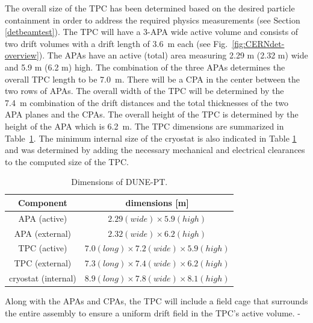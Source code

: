 The overall size of the TPC has been determined based on the desired particle containment in order to address the required physics measurements (see Section \ref{detbeamtest}). The TPC will have a 3-APA wide active volume and consists of two drift volumes with a drift length of 3.6~m each (see Fig.~\ref{fig:CERNdet-overview}).  
The APAs have an active (total) area measuring 2.29 m (2.32 m) wide and 5.9 m (6.2 m) high. The combination of the three APAs determines the overall TPC length to be 7.0~m. There will be a CPA in the center between the two rows of APAs.  
The overall width of the TPC will be determined by the 7.4~m combination of the drift distances and the total thicknesses of the two APA planes and the CPAs.  
The overall height of the TPC is determined by the height of the APA which is 6.2~m.  The TPC dimensions are summarized in 
Table~\ref{table:TPC-dim}.
%
The minimum internal size of the cryostat is also indicated in Table \ref{table:TPC-dim} and was determined by adding the necessary mechanical and electrical clearances to the computed size of the TPC.  
 
\begin{table}[h]
\centering
\begin{tabular}{|c|c|}
\hline
\textbf{ Component } & dimensions [m]  \\ \hline \hline
APA  (active) &  $2.29 (wide) \times 5.9 (high)$ \\ \hline
APA  (external) &  $2.32 (wide) \times 6.2 (high)$ \\ \hline
TPC (active)       & $7.0 (long) \times 7.2 (wide) \times 5.9 (high)$  \\ \hline
TPC (external)       & $7.3 (long) \times 7.4 (wide) \times 6.2 (high)$  \\ \hline
cryostat (internal) &  $8.9 (long) \times 7.8 (wide) \times 8.1 (high)$  \\ \hline
\end{tabular}
\caption{Dimensions of DUNE-PT.}
\label{table:TPC-dim}
\end{table} 

Along with the APAs and CPAs, the TPC will include a field cage that surrounds the entire assembly to ensure a uniform drift field in the TPC's active volume. -


